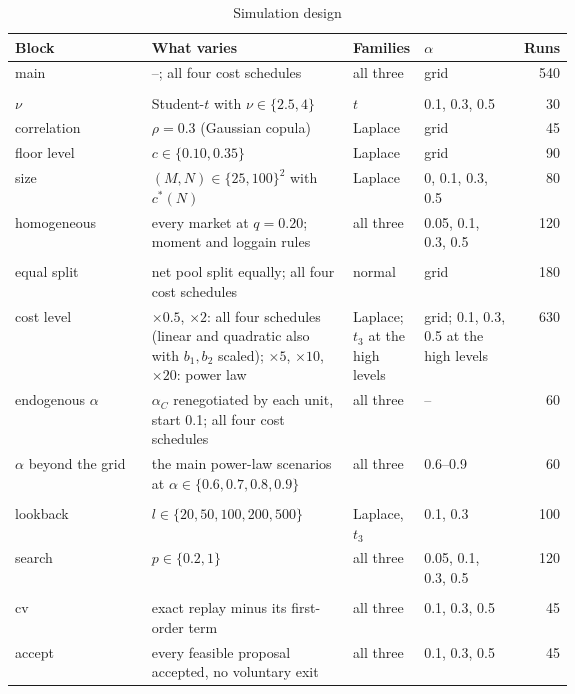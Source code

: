 \begin{table}[htbp]
\centering
\caption{Simulation design}
\label{tab:design}
\small
\begin{tabular}{lp{0.36\linewidth}p{0.12\linewidth}p{0.17\linewidth}r}
\toprule
Block & What varies & Families & $\alpha$ & Runs \\
\midrule
main & --; all four cost schedules & all three & grid & 540 \\
\addlinespace[3pt]
\multicolumn{5}{l}{\emph{Environment}} \\
$\nu$ & Student-$t$ with $\nu \in \{2.5, 4\}$ & $t$ & 0.1, 0.3, 0.5 & 30 \\
correlation & $\rho = 0.3$ (Gaussian copula) & Laplace & grid & 45 \\
floor level & $c \in \{0.10, 0.35\}$ & Laplace & grid & 90 \\
size & $(M, N) \in \{25, 100\}^2$ with $c^*(N)$ & Laplace & 0, 0.1, 0.3, 0.5 & 80 \\
homogeneous & every market at $q = 0.20$; moment and loggain rules & all three & 0.05, 0.1, 0.3, 0.5 & 120 \\
\addlinespace[3pt]
\multicolumn{5}{l}{\emph{Contract}} \\
equal split & net pool split equally; all four cost schedules & normal & grid & 180 \\
cost level & $\times 0.5$, $\times 2$: all four schedules (linear and quadratic also with $b_1, b_2$ scaled); $\times 5$, $\times 10$, $\times 20$: power law & Laplace; $t_3$ at the high levels & grid; 0.1, 0.3, 0.5 at the high levels & 630 \\
endogenous $\alpha$ & $\alpha_C$ renegotiated by each unit, start 0.1; all four cost schedules & all three & -- & 60 \\
$\alpha$ beyond the grid & the main power-law scenarios at $\alpha \in \{0.6, 0.7, 0.8, 0.9\}$ & all three & 0.6--0.9 & 60 \\
\addlinespace[3pt]
\multicolumn{5}{l}{\emph{Decisions}} \\
lookback & $l \in \{20, 50, 100, 200, 500\}$ & Laplace, $t_3$ & 0.1, 0.3 & 100 \\
search & $p \in \{0.2, 1\}$ & all three & 0.05, 0.1, 0.3, 0.5 & 120 \\
\addlinespace[3pt]
\multicolumn{5}{l}{\emph{Rule controls (3.3)}} \\
cv & exact replay minus its first-order term & all three & 0.1, 0.3, 0.5 & 45 \\
accept & every feasible proposal accepted, no voluntary exit & all three & 0.1, 0.3, 0.5 & 45 \\

\end{tabular}
\end{table}

